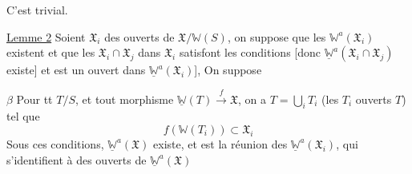 C'est trivial. 


\uline{Lemme 2} Soient $\mathfrak X_i$ des ouverts de $\mathfrak X/\mathbb W(S)$, on suppose  que  les $\mathbb W^a(\mathfrak X_i)$ existent   et que les $\mathfrak X_i\cap\mathfrak X_j$ dans $\mathfrak X_i$ satisfont les  conditions  [donc $\underline{\mathbb W}^a(\mathfrak X_i\cap\mathfrak X_j)$ existe] et est un ouvert dans $\underline{\mathbb W}^a(\mathfrak X_i)$],  On suppose

\textcircled{$\beta$} Pour tt $T/S$, et tout morphisme $\underline{\mathbb W}(T)\xrightarrow f\mathfrak X$, on a $T=\bigcup_i T_i$ (les $T_i$ ouverts  $T$) tel que
\[
 f(\mathbb W(T_i))\subset\mathfrak X_i
\]
Sous ces conditions, $\underline{\mathbb W}^a(\mathfrak X)$ existe, et est la réunion des $\underline{\mathbb W}^a(\mathfrak X_i)$, qui s'identifient à des ouverts de $\underline{\mathbb W}^a(\mathfrak X)$
